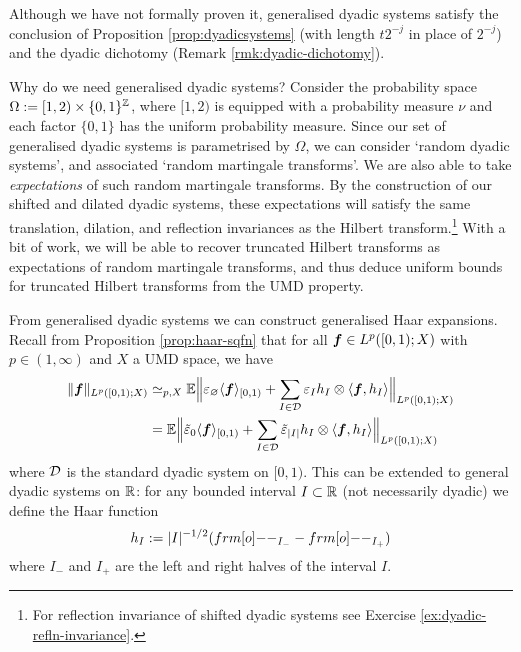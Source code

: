 \begin{rmk}
  Although we have not formally proven it, generalised dyadic systems satisfy the conclusion of Proposition \ref{prop:dyadicsystems} (with length $t2^{-j}$ in place of $2^{-j}$) and the dyadic dichotomy (Remark \ref{rmk:dyadic-dichotomy}).  
\end{rmk}


Why do we need generalised dyadic systems?
Consider the probability space $\Omega := [1,2) \times \{0,1\}^{\mathbb{Z}}$, where $[1,2)$ is equipped with a probability measure $\nu$ and each factor $\{0,1\}$ has the uniform probability measure.
Since our set of generalised dyadic systems is parametrised by $\Omega$, we can consider `random dyadic systems', and associated `random martingale transforms'.
We are also able to take \emph{expectations} of such random martingale transforms.
By the construction of our shifted and dilated dyadic systems, these expectations will satisfy the same translation, dilation, and reflection invariances as the Hilbert transform.\footnote{For reflection invariance of shifted dyadic systems see Exercise \ref{ex:dyadic-refln-invariance}.}
With a bit of work, we will be able to recover truncated Hilbert transforms as expectations of random martingale transforms, and thus deduce uniform bounds for truncated Hilbert transforms from the UMD property.

From generalised dyadic systems we can construct generalised Haar expansions.
Recall from Proposition \ref{prop:haar-sqfn} that for all $\bm{f} \in L^p([0,1);X)$ with $p \in (1,\infty)$ and $X$ a UMD space, we have 
  \begin{equation*}
    \begin{aligned}
    \|\bm{f}\|_{L^p([0,1);X)}
    &\simeq_{p,X} \mathbb{E} \Big\| \varepsilon_{\varnothing} \langle \bm{f} \rangle_{[0,1)} +  \sum_{I \in \mathcal{D}} \varepsilon_{I} h_{I} \otimes \langle \bm{f}, h_{I} \rangle \Big\|_{L^p([0,1);X)} \\
    &= \mathbb{E} \Big\| \tilde{\varepsilon}_{0} \langle \bm{f} \rangle_{[0,1)} + \sum_{I \in \mathcal{D}} \tilde{\varepsilon}_{|I|} h_{I} \otimes \langle \bm{f}, h_{I} \rangle \Big\|_{L^p([0,1);X)}
  \end{aligned}
\end{equation*}
where $\mathcal{D}$ is the standard dyadic system on $[0,1)$.
This can be extended to general dyadic systems on $\mathbb{R}$: for any bounded interval $I \subset \mathbb{R}$ (not necessarily dyadic) we define the Haar function
\begin{equation*}
  h_{I} := |I|^{-1/2}(\1_{I_{-}} - \1_{I_{+}})
\end{equation*}
where $I_{-}$ and $I_{+}$ are the left and right halves of the interval $I$.


